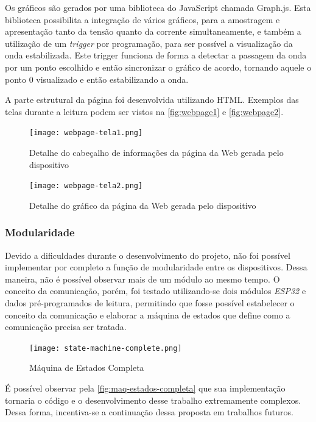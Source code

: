 Os gráficos são gerados por uma biblioteca do JavaScript chamada Graph.js. Esta biblioteca possibilita a integração de vários gráficos, para a amostragem e apresentação tanto da tensão quanto da corrente simultaneamente, e também a utilização de um \textit{trigger} por programação, para ser possível a visualização da onda estabilizada. Este trigger funciona de forma a detectar a passagem da onda por um ponto escolhido e então sincronizar o gráfico de acordo, tornando aquele o ponto 0 visualizado e então estabilizando a onda.

A parte estrutural da página foi desenvolvida utilizando \gls{HTML}. Exemplos das telas durante a leitura podem ser vistos na \autoref{fig:webpage1} e \autoref{fig:webpage2}.

\begin{figure}[h!]
    \centering
    \caption{Detalhe do cabeçalho de informações da página da Web gerada pelo dispositivo}
    \texttt{[image: webpage-tela1.png]}
    \label{fig:webpage1}
    \fonte{}
\end{figure}

\begin{figure}[h!]
    \centering
    \caption{Detalhe do gráfico da página da Web gerada pelo dispositivo}
    \texttt{[image: webpage-tela2.png]}
    \label{fig:webpage2}
    \fonte{}
\end{figure}

\subsubsection{Modularidade}\label{modular-softw}

Devido a dificuldades durante o desenvolvimento do projeto, não foi possível implementar por completo a função de modularidade entre os dispositivos. Dessa maneira, não é possível observar mais de um módulo ao mesmo tempo.
O conceito da comunicação, porém, foi testado utilizando-se dois módulos \textit{ESP32} e dados pré-programados de leitura, permitindo que fosse possível estabelecer o conceito da comunicação e elaborar a máquina de estados que define como a comunicação precisa ser tratada.

\begin{figure}[h!]
    \centering
    \caption{Máquina de Estados Completa}
    \texttt{[image: state-machine-complete.png]}
    \label{fig:maq-estados-completa}
    \fonte{}
\end{figure}

É possível observar pela \autoref{fig:maq-estados-completa} que sua implementação tornaria o código e o desenvolvimento desse trabalho extremamente complexos. Dessa forma, incentiva-se a continuação dessa proposta em trabalhos futuros.

